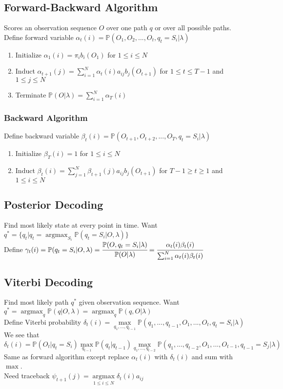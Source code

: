\documentclass{article}
\renewcommand{\P}{\mathbb{P}}
\DeclareMathOperator*{\argmax}{argmax}
\begin{document}
\subsection{Forward-Backward Algorithm}
Scores an observation sequence $O$ over one path $q$ or over all possible paths. \\
Define forward variable $\alpha_t(i) = \P(O_1, O_2, ..., O_t, q_t = S_i | \lambda)$
\begin{enumerate}
\item Initialize $\alpha_1(i) = \pi_i b_i(O_1)$ for $1 \leq i \leq N$
\item Induct $\alpha_{t+1}(j) = \sum_{i=1}^N \alpha_t(i)a_{ij} b_j(O_{t+1})$ for $1 \leq t \leq T -1$ and $1 \leq j \leq N$
\item Terminate $\P(O | \lambda) = \sum_{i=1}^N \alpha_T(i)$
\end{enumerate}
\subsubsection{Backward Algorithm}
Define backward variable $\beta_t(i) = \P(O_{t+1}, O_{t+2}, ..., O_T, q_t = S_i | \lambda)$
\begin{enumerate}
\item Initialize $\beta_T(i) = 1$ for $1 \leq i \leq N$
\item Induct $\beta_{t}(i) = \sum_{j=1}^N \beta_{t+1}(j) a_{ij} b_j(O_{t+1})$ for $T-1 \geq t \geq 1$ and $1 \leq i \leq N$
\end{enumerate}
\subsection{Posterior Decoding}
Find most likely state at every point in time. Want $q^* = \{q_t | q_t = \argmax_{S_i}\P(q_t = S_i | O, \lambda)\}$ \\
Define $\gamma_t(i) = \P(q_t = S_i | O, \lambda) = \cfrac{\P(O, q_t = S_i | \lambda)}{\P(O | \lambda)} = \cfrac{\alpha_t(i)\beta_t(i)}{\sum_{i=1}^N \alpha_t(i)\beta_t(i)}$
\subsection{Viterbi Decoding}
Find most likely path $q^*$ given observation sequence. Want $q^* = \argmax_q \P(q | O, \lambda) = \argmax_q \P(q, O | \lambda)$ \\
Define Viterbi probability $\delta_t(i) = \max\limits_{q_1, ..., q_{t-1}}\P(q_1, ..., q_{t-1}, O_1, ..., O_t, q_{t} = S_i| \lambda)$ \\
We see that $\delta_t(i)= \P(O_t | q_t = S_i) \max\limits_{q_{t-1}} \P(q_t | q_{t-1}) \max\limits_{q_1, ..., q_{t-2}}\P(q_1, ..., q_{t-2}, O_1, ..., O_{t-1}, q_{t-1} = S_j | \lambda)$ \\
Same as forward algorithm except replace $\alpha_t(i)$ with $\delta_t(i)$ and sum with $\max$. \\
Need traceback $\psi_{t+1}(j) = \argmax\limits_{1 \leq i \leq N} \delta_t(i)a_{ij}$
\end{document}
